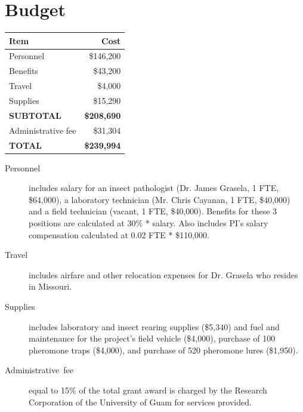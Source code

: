 \documentclass[12pt,letterpaper,english,bibliography=totocnumbered, abstract=on]{scrartcl}
\begin{document}
\newpage
\section{Budget}

\begin{center}
\begin{tabular}{lr}
\hline 
\textbf{Item}      & \textbf{Cost}\\
\hline 
Personnel          & \$146,200 \\
Benefits           &  \$43,200 \\
Travel             &   \$4,000 \\
Supplies           &  \$15,290 \\
\hline 
\textbf{SUBTOTAL}  & \textbf{\$208,690} \\
\hline
Administrative fee & \$31,304 \\
\hline 
\textbf{TOTAL}	   & \textbf{\$239,994} \\
\hline 
\end{tabular} 
\par\end{center}

\begin{description}
	
\item [{Personnel}] includes salary for an insect pathologist (Dr. James Grasela, 1 FTE, \$64,000), 
a laboratory technician (Mr. Chris Cayanan, 1 FTE, \$40,000) and a field technician (vacant, 1 FTE, \$40,000). Benefits for these 3 positions are calculated at 30\% * salary. Also includes PI's salary compensation calculated at 0.02 FTE * \$110,000.

\item [{Travel}] includes airfare and other relocation expenses for Dr. Grasela who resides in Missouri.

\item [{Supplies}] includes laboratory and insect rearing supplies (\$5,340) and fuel and maintenance for the project's field vehicle (\$4,000), purchase of 100 pheromone traps (\$4,000), and purchase of 520 pheromone lures (\$1,950). 

\item [{Administrative~fee}] equal to 15\% of the total grant award
is charged by the Research Corporation of the University of Guam for
services provided.

\end{description}

\newpage
\printbibliography
\end{document}
